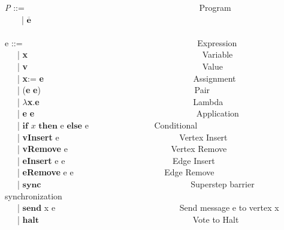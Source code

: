 \begin{frame}
  \tiny{
    \textit{P} ::= \ \ \ \ \ \ \ \ \ \ \ \ \ \ \ \ \ \ \ \ \ \ \ \ \ \ \ \ \ \ \ \ \ \ \ \ \ \ \ \ \ Program \\
    \ \ \ \  | $\overline {\textbf{e}}$ \\
\ \\
  e ::= \ \ \ \ \ \ \ \ \ \ \ \ \ \ \ \ \ \ \ \ \ \ \ \ \ \ \ \ \ \ \ \ \ \ \ \ \ \ \ \ \ Expression \\
  \ \ \ | \textbf{x} \ \ \ \ \ \ \ \ \ \ \  \ \ \ \ \ \ \ \ \ \ \ \ \ \ \ \ \ \ \ \ \ \ \ \ \ \ \ \ \ \ Variable \\
  \ \ \ | \textbf{v}  \ \ \ \ \ \ \ \ \ \ \ \  \ \ \ \ \ \ \ \ \ \ \ \ \ \ \ \ \ \ \ \ \ \ \ \ \ \ \ \ \ Value \\
  \ \ \ | \textbf{x}:= \textbf{e}   \ \ \ \ \ \ \ \ \ \ \ \  \ \ \ \ \ \ \ \ \ \ \ \ \ \ \ \ \ \ \ \ \ \ \ Assignment \\
  \ \ \ | (\textbf{e} \textbf{e})   \ \ \ \ \ \ \ \ \ \ \  \ \ \ \ \ \ \ \ \ \ \ \ \ \ \ \ \ \ \ \ \ \ \ \ \ Pair \\
  \ \ \ | $\lambda$\textbf{x}.\textbf{e}  \ \ \ \ \ \ \ \ \ \ \  \ \ \ \ \ \ \ \ \ \ \ \ \ \ \ \ \ \ \ \ \ \ \ \ \ Lambda \\
  \ \ \ | \textbf{e} \textbf{e}   \ \ \ \ \ \ \ \ \ \ \  \ \ \ \ \ \ \ \ \ \ \ \ \ \ \ \ \ \ \ \ \ \ \ \ \ \ \ Application \\
  \ \ \ |  $\textbf{if}$ $x$ $\textbf{then}$ e $\textbf{else}$ e \ \ \ \ \ \ \ \ \ \ \ \ \ \ \ Conditional \\
  \ \ \ |  \textbf{vInsert} e  \ \ \ \ \ \ \ \ \ \ \ \ \ \ \ \ \ \ \ \ \ \ \ \ \ \ \ \ Vertex Insert \\
  \ \ \ |  \textbf{vRemove} e  \ \ \ \ \ \ \ \ \ \ \ \ \ \ \ \ \ \ \ \ \ \ \ \ Vertex Remove \\
  \ \ \ |  \textbf{eInsert} e e   \ \ \ \ \ \ \ \ \ \ \ \ \ \ \ \ \ \ \ \ \ \ \ \ \  Edge Insert \\
  \ \ \ |  \textbf{eRemove} e e \ \ \ \ \ \ \ \ \ \ \ \ \ \ \ \ \ \ \ \ \  Edge Remove \\
  \ \ \ |  $\textbf{sync}$ \ \ \ \ \ \ \ \  \ \ \ \ \ \ \  \ \ \ \ \ \ \ \  \ \ \ \ \ \ \ \ \ \ \ \ Superstep barrier synchronization\\
  \ \ \ |  $\textbf{send}$ x e \ \ \ \ \ \ \ \ \ \ \ \ \ \ \ \ \ \ \ \ \ \ \ \ \ \ \ \ \ Send message e to vertex x \\
  \ \ \ |  $\textbf{halt}$ \ \ \ \  \ \ \ \ \ \ \ \  \ \ \ \ \ \ \ \ \ \ \ \ \ \ \ \ \ \ \ \ \ \ \ \ Vote to Halt \\
}
\end{frame}
